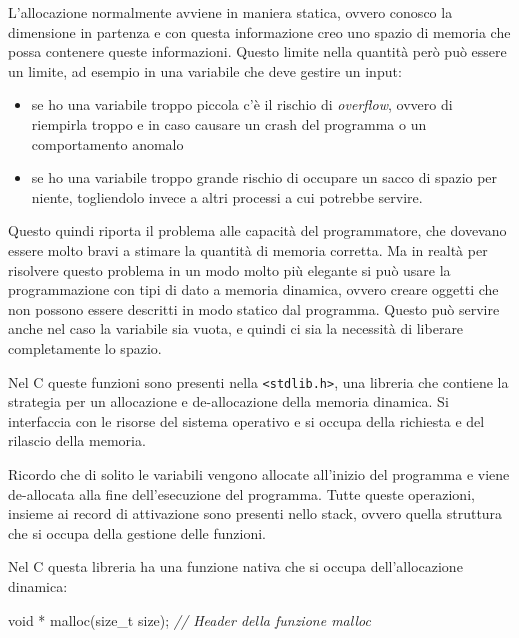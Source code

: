 \documentclass[
]{article}
\newenvironment{Shaded}{}{}
\newcommand{\CommentTok}[1]{\textcolor[rgb]{0.38,0.63,0.69}{\textit{#1}}}
\newcommand{\DataTypeTok}[1]{\textcolor[rgb]{0.56,0.13,0.00}{#1}}
\newcommand{\NormalTok}[1]{#1}
\begin{document}
L'allocazione normalmente avviene in maniera statica, ovvero conosco la
dimensione in partenza e con questa informazione creo uno spazio di
memoria che possa contenere queste informazioni. Questo limite nella
quantità però può essere un limite, ad esempio in una variabile che deve
gestire un input:

\begin{itemize}
\item
  se ho una variabile troppo piccola c'è il rischio di \emph{overflow},
  ovvero di riempirla troppo e in caso causare un crash del programma o
  un comportamento anomalo
\item
  se ho una variabile troppo grande rischio di occupare un sacco di
  spazio per niente, togliendolo invece a altri processi a cui potrebbe
  servire.
\end{itemize}

Questo quindi riporta il problema alle capacità del programmatore, che
dovevano essere molto bravi a stimare la quantità di memoria corretta.
Ma in realtà per risolvere questo problema in un modo molto più elegante
si può usare la programmazione con tipi di dato a memoria dinamica,
ovvero creare oggetti che non possono essere descritti in modo statico
dal programma. Questo può servire anche nel caso la variabile sia vuota,
e quindi ci sia la necessità di liberare completamente lo spazio.

Nel C queste funzioni sono presenti nella
\texttt{\textless{}stdlib.h\textgreater{}}, una libreria che contiene la
strategia per un allocazione e de-allocazione della memoria dinamica. Si
interfaccia con le risorse del sistema operativo e si occupa della
richiesta e del rilascio della memoria.

Ricordo che di solito le variabili vengono allocate all'inizio del
programma e viene de-allocata alla fine dell'esecuzione del programma.
Tutte queste operazioni, insieme ai record di attivazione sono presenti
nello stack, ovvero quella struttura che si occupa della gestione delle
funzioni.

Nel C questa libreria ha una funzione nativa che si occupa
dell'allocazione dinamica:

\begin{Shaded}
\begin{Highlighting}[]
\DataTypeTok{void}\NormalTok{ * malloc(}\DataTypeTok{size\_t}\NormalTok{ size); }\CommentTok{// Header della funzione malloc}
\end{Highlighting}
\end{Shaded}
\end{document}
